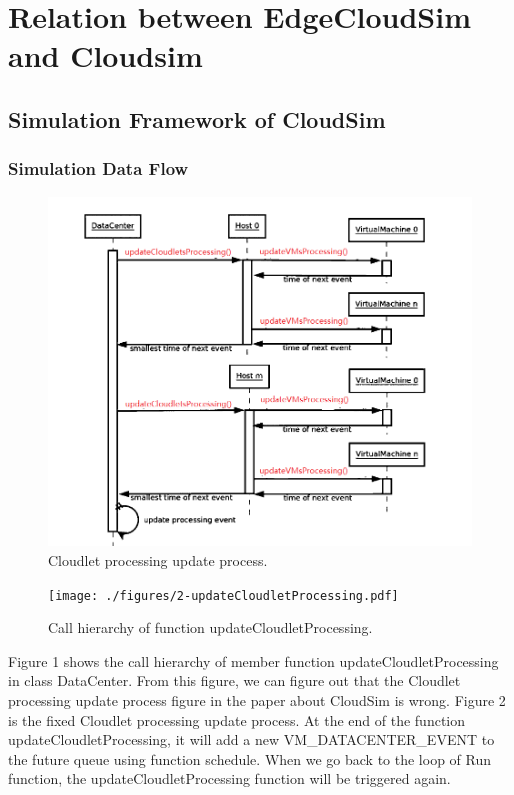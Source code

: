 \section{Relation between EdgeCloudSim and Cloudsim}

\subsection{Simulation Framework of CloudSim}
\subsubsection{Simulation Data Flow}


\begin{figure}
	\centering
	\includegraphics[width=1\textwidth]{./figures/3-processingSequence.png}
	\caption{\label{fig:processingSequence}Cloudlet processing update process.}
\end{figure}

\begin{figure}
	\centering
	\texttt{[image: ./figures/2-updateCloudletProcessing.pdf]}
	\caption{\label{fig:cloudletProcessing}Call hierarchy of function updateCloudletProcessing.}
\end{figure}

Figure 1 shows the call hierarchy of member function updateCloudletProcessing in class DataCenter. From this figure, we can figure out that the Cloudlet processing update process figure in the paper about CloudSim is wrong. Figure 2 is the fixed Cloudlet processing update process. At the end of the function updateCloudletProcessing, it will add a new VM\_DATACENTER\_EVENT to the future queue using function schedule. When we go back to the loop of Run function, the updateCloudletProcessing function will be triggered again.

